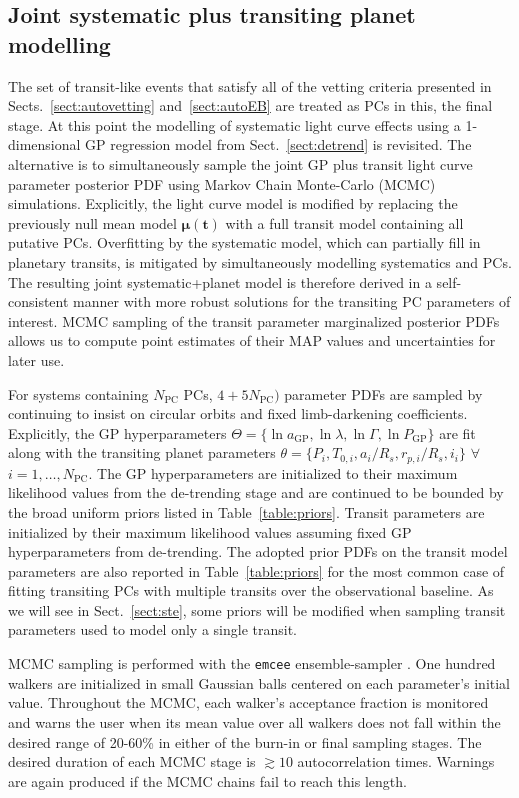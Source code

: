 \subsection{Joint systematic plus transiting planet modelling} \label{sect:joint}
The set of transit-like events that satisfy all of the  vetting criteria
presented in Sects.~\ref{sect:autovetting} and~\ref{sect:autoEB} are treated
as PCs in this, the final \pipeline{} stage. At this point the modelling of systematic
light curve effects using a 1-dimensional GP regression model from Sect.~\ref{sect:detrend}
is revisited. The alternative is to simultaneously sample the joint GP plus transit light curve
parameter posterior PDF using Markov Chain Monte-Carlo (MCMC) simulations.
Explicitly, the light curve model is modified by replacing the previously null mean model
$\boldsymbol{\mu}(\mathbf{t})$ with a full transit model containing all putative PCs. 
Overfitting by the systematic model, which can partially fill in planetary
transits, is mitigated by simultaneously modelling systematics and PCs.
The resulting joint systematic+planet model is therefore derived in a self-consistent
manner with more robust solutions for the transiting PC parameters of interest.
MCMC sampling of the transit parameter marginalized posterior PDFs allows us to compute
point estimates of their MAP values and uncertainties for later use.

For systems containing $N_{\text{PC}}$ PCs, $4+5N_{\text{PC}})$ parameter PDFs are sampled
by continuing to insist on circular orbits and fixed limb-darkening coefficients.
Explicitly, the GP
hyperparameters $\Theta = \{\ln{a_{\text{GP}}},\ln{\lambda},\ln{\Gamma},\ln{P_{\text{GP}}}\}$
are fit along with the
transiting planet parameters $\theta = \{P_i,T_{0,i},a_i/R_s,r_{p,i}/R_s,i_i \}$
$\forall$ $i=1,\dots,N_{\text{PC}}$. The GP hyperparameters are initialized to their maximum
likelihood values from the de-trending stage and are continued to be bounded by the broad
uniform priors listed in Table~\ref{table:priors}. Transit parameters are
initialized by their maximum likelihood values assuming fixed GP hyperparameters from
de-trending. The adopted prior PDFs on the transit model parameters are also reported
in Table~\ref{table:priors} for the most common case of fitting transiting PCs with
multiple transits over the observational baseline.
As we will see in Sect.~\ref{sect:ste}, some priors will be modified when sampling transit
parameters used to model only a single transit. 

MCMC sampling is performed with the \texttt{emcee}
ensemble-sampler \citep{foremanmackey13}. One hundred walkers are initialized in small Gaussian balls
centered on each parameter's initial value. Throughout the MCMC, each walker's acceptance
fraction is monitored and warns the user when its mean value over all walkers does not
fall within the desired range of 20-60\% in either of the burn-in or final sampling stages.
The desired duration of each MCMC stage is $\gtrsim 10$ autocorrelation times. Warnings are again produced
if the MCMC chains fail to reach this length.

